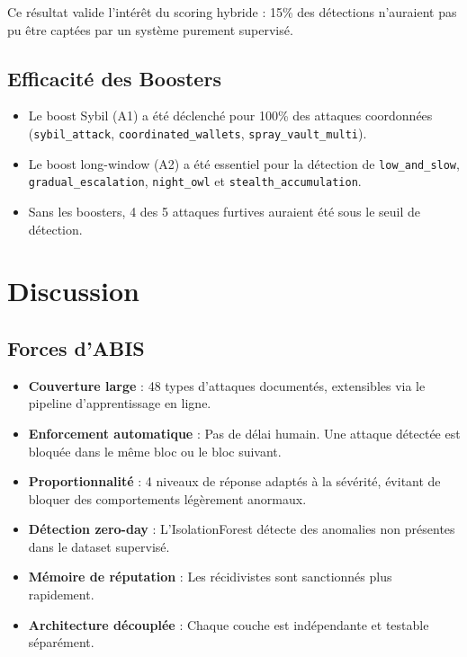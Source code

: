\documentclass[12pt,a4paper]{report}
\newcommand{\code}[1]{\texttt{#1}}
\begin{document}
Ce résultat valide l'intérêt du scoring hybride : 15\% des détections n'auraient pas pu être captées par un système purement supervisé.

\subsection{Efficacité des Boosters}

\begin{itemize}
  \item Le boost Sybil (A1) a été déclenché pour 100\% des attaques coordonnées (\code{sybil\_attack}, \code{coordinated\_wallets}, \code{spray\_vault\_multi}).
  \item Le boost long-window (A2) a été essentiel pour la détection de \code{low\_and\_slow}, \code{gradual\_escalation}, \code{night\_owl} et \code{stealth\_accumulation}.
  \item Sans les boosters, 4 des 5 attaques furtives auraient été sous le seuil de détection.
\end{itemize}

\section{Discussion}

\subsection{Forces d'ABIS}

\begin{successbox}
\begin{itemize}
  \item \textbf{Couverture large} : 48 types d'attaques documentés, extensibles via le pipeline d'apprentissage en ligne.
  \item \textbf{Enforcement automatique} : Pas de délai humain. Une attaque détectée est bloquée dans le même bloc ou le bloc suivant.
  \item \textbf{Proportionnalité} : 4 niveaux de réponse adaptés à la sévérité, évitant de bloquer des comportements légèrement anormaux.
  \item \textbf{Détection zero-day} : L'IsolationForest détecte des anomalies non présentes dans le dataset supervisé.
  \item \textbf{Mémoire de réputation} : Les récidivistes sont sanctionnés plus rapidement.
  \item \textbf{Architecture découplée} : Chaque couche est indépendante et testable séparément.
\end{itemize}
\end{successbox}
\end{document}
